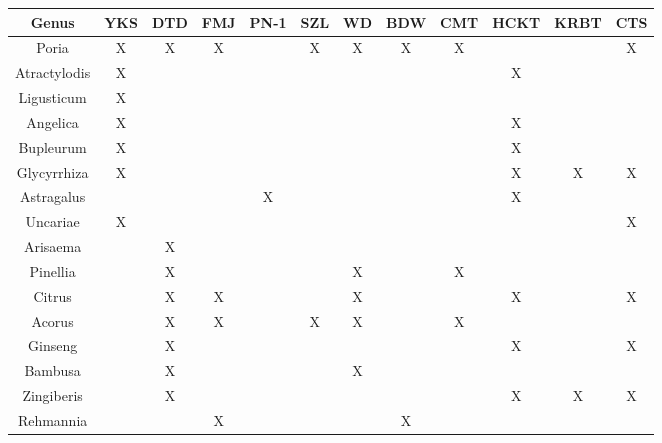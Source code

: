 \documentclass[twocolumn]{article}
\begin{document}
\begin{table*}[htp]
\centering

\begin{tabular}{||c c c c c c c c c c c c||}
 \hline
 Genus          & YKS & DTD & FMJ & PN-1 & SZL & WD & BDW & CMT & HCKT & KRBT & CTS \\
 \hline\hline
 Poria          &  X  &  X  &  X  &      &  X  & X  &  X  &  X  &      &      &  X  \\
 Atractylodis   &  X  &     &     &      &     &    &     &     &  X   &      &     \\
 Ligusticum     &  X  &     &     &      &     &    &     &     &      &      &     \\
 Angelica       &  X  &     &     &      &     &    &     &     &  X   &      &     \\
 Bupleurum      &  X  &     &     &      &     &    &     &     &  X   &      &     \\
 Glycyrrhiza    &  X  &     &     &      &     &    &     &     &  X   &  X   &  X  \\
 Astragalus     &     &     &     &  X   &     &    &     &     &  X   &      &     \\
 Uncariae       &  X  &     &     &      &     &    &     &     &      &      &  X  \\
 Arisaema       &     &  X  &     &      &     &    &     &     &      &      &     \\
 Pinellia       &     &  X  &     &      &     & X  &     &  X  &      &      &     \\
 Citrus         &     &  X  &  X  &      &     & X  &     &     &  X   &      &  X  \\
 Acorus         &     &  X  &  X  &      &  X  & X  &     &  X  &      &      &     \\
 Ginseng        &     &  X  &     &      &     &    &     &     &  X   &      &  X  \\
 Bambusa        &     &  X  &     &      &     & X  &     &     &      &      &     \\
 Zingiberis     &     &  X  &     &      &     &    &     &     &  X   &  X   &  X  \\
 Rehmannia      &     &     &  X  &      &     &    &  X  &     &      &      &     \\

\end{tabular}
\end{table*}
\end{document}
